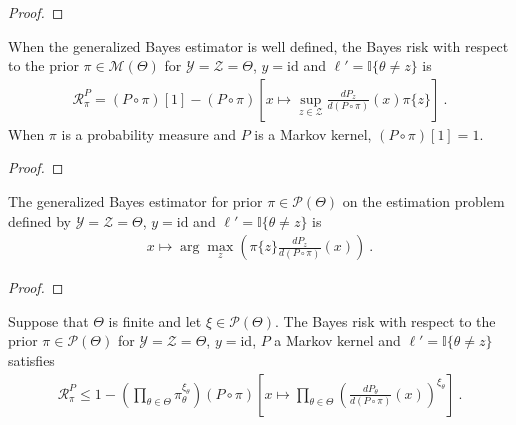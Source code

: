 \begin{proof}%
{}

\end{proof}


\begin{lemma}
  \label{lem:bayesRisk_binary_eq_sub}
  When the generalized Bayes estimator is well defined, the Bayes risk with respect to the prior $\pi \in \mathcal M(\Theta)$ for $\mathcal Y = \mathcal Z = \Theta$, $y = \mathrm{id}$ and $\ell' = \mathbb{I}\{\theta \ne z\}$ is
  \begin{align*}
  \mathcal R^P_\pi = (P \circ \pi)[1] - (P \circ \pi)\left[x \mapsto \sup_{z \in \mathcal Z} \frac{d P_z}{d (P \circ \pi)}(x) \pi\{z\} \right]
  \: .
  \end{align*}
  When $\pi$ is a probability measure and $P$ is a Markov kernel, $(P \circ \pi)[1] = 1$.
\end{lemma}

\begin{proof}%
{}

\end{proof}


\begin{lemma}
  \label{lem:genBayesEstimator_binary}
  The generalized Bayes estimator for prior $\pi \in \mathcal P(\Theta)$ on the estimation problem defined by $\mathcal Y = \mathcal Z = \Theta$, $y = \mathrm{id}$ and $\ell' = \mathbb{I}\{\theta \ne z\}$ is
  \begin{align*}
  x \mapsto \arg\max_z \left( \pi\{z\} \frac{d P_z}{d (P \circ \pi)}(x) \right)
  \: .
  \end{align*}
\end{lemma}

\begin{proof}%
{}

\end{proof}


\begin{lemma}
  \label{lem:bayesRisk_binary_le_sub_prod}
  Suppose that $\Theta$ is finite and let $\xi \in \mathcal P(\Theta)$.
  The Bayes risk with respect to the prior $\pi \in \mathcal P(\Theta)$ for $\mathcal Y = \mathcal Z = \Theta$, $y = \mathrm{id}$, $P$ a Markov kernel and $\ell' = \mathbb{I}\{\theta \ne z\}$ satisfies
  \begin{align*}
  \mathcal R^P_\pi \le 1 - \left(\prod_{\theta \in \Theta} \pi_\theta^{\xi_\theta}\right) (P \circ \pi)\left[x \mapsto \prod_{\theta \in \Theta} \left(\frac{d P_\theta}{d (P \circ \pi)}(x)\right)^{\xi_\theta} \right]
  \: .
  \end{align*}
\end{lemma}

